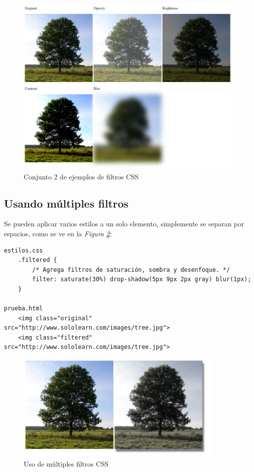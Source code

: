 \begin{figure}[H]
    \centering
    \caption{Conjunto 2 de ejemplos de filtros CSS}
    \label{fig: 60}
    \includegraphics[width=14cm]{ss/filter-examples-2.png}
\end{figure}


\subsection{Usando múltiples filtros}

Se pueden aplicar varios estilos a un solo elemento, simplemente se separan por espacios, como se ve en la \textit{Figura \ref{fig: 61}}:
\begin{lstlisting}
estilos.css
    .filtered {
        /* Agrega filtros de saturación, sombra y desenfoque. */
        filter: saturate(30%) drop-shadow(5px 9px 2px gray) blur(1px);
    }

prueba.html
    <img class="original" src="http://www.sololearn.com/images/tree.jpg">
    <img class="filtered" src="http://www.sololearn.com/images/tree.jpg">
\end{lstlisting}
\begin{figure}[H]
    \centering
    \caption{Uso de múltiples filtros CSS}
    \label{fig: 61}
    \includegraphics[width=10cm]{ss/filter-multiple.png}
\end{figure}
